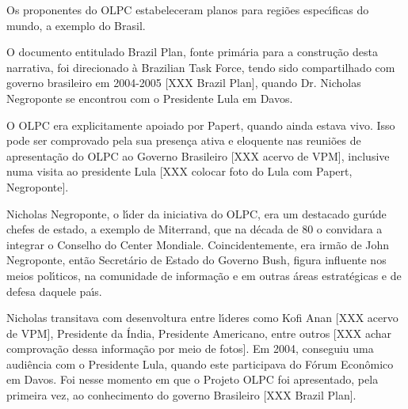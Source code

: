 \documentclass[
12pt,		%
openright,	%
twoside,  %
a4paper,			%
chapter=TITLE,		%
english,			%
french,				%
spanish,			%
brazil				%
]{USPSC-classe/USPSC}
\begin{document}
Os proponentes do OLPC estabeleceram planos para regi\~oes espec\'{\i}ficas do mundo, a exemplo do Brasil.










O documento entitulado \textquotedbl Brazil Plan\textquotedbl , fonte prim\'aria para a constru\c{c}\~ao desta narrativa, foi direcionado \`a \textquotedbl Brazilian Task Force\textquotedbl , tendo sido compartilhado com governo brasileiro em 2004-2005 [XXX Brazil Plan], quando Dr. Nicholas Negroponte se encontrou com o Presidente Lula em Davos.










O OLPC era explicitamente apoiado por Papert, quando ainda estava vivo. Isso pode ser comprovado pela sua presen\c{c}a ativa e eloquente nas reuni\~oes de apresenta\c{c}\~ao do OLPC ao Governo Brasileiro [XXX acervo de VPM], inclusive numa visita ao presidente Lula [XXX colocar foto do Lula com Papert, Negroponte].










Nicholas Negroponte, o l\'{\i}der da iniciativa do OLPC, era um destacado \textquotedbl gur\'u\textquotedbl  de chefes de estado, a exemplo de Miterrand, que na d\'ecada de 80 o convidara a integrar o Conselho do \textquotedbl Center Mondiale. Coincidentemente, era irm\~ao de John Negroponte, ent\~ao Secret\'ario de Estado do Governo Bush, figura influente nos meios pol\'{\i}ticos, na comunidade de informa\c{c}\~ao e em outras \'areas estrat\'egicas e de defesa daquele pa\'{\i}s.










Nicholas transitava com desenvoltura entre l\'{\i}deres como Kofi Anan [XXX acervo de VPM], Presidente da \'India, Presidente Americano, entre outros [XXX achar comprova\c{c}\~ao dessa informa\c{c}\~ao por meio de fotos]. Em 2004, conseguiu uma audi\^encia com o Presidente Lula, quando este participava do F\'orum  Econ\^omico  em Davos. Foi nesse momento em que o Projeto OLPC foi apresentado, pela primeira vez, ao conhecimento do governo Brasileiro [XXX Brazil Plan].
\end{document}
